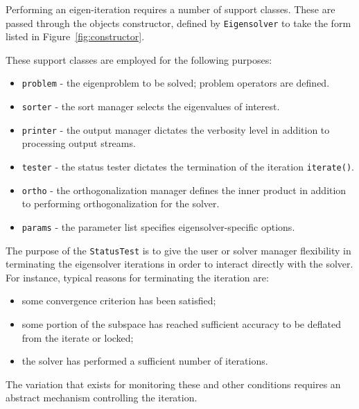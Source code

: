 \documentclass[acmtoms]{acmtrans2m}
\newcommand{\aspace}[1]{\texttt{#1}}
\begin{document}
Performing an eigen-iteration requires a number of support classes.  These are passed
through the objects constructor, defined by \aspace{Eigensolver} to take the form listed
in Figure~\ref{fig:constructor}.

These support classes are employed for the following purposes:
\begin{itemize}
  \item \verb!problem! - the eigenproblem to be solved; problem operators are
  defined.
  \item \verb!sorter! - the sort manager selects the
  eigenvalues of interest.
  \item \verb!printer! - the output manager dictates the verbosity level in addition to
    processing output streams.
  \item \verb!tester! - the status tester dictates the termination of the iteration
  \verb!iterate()!.
  \item \verb!ortho! - the orthogonalization manager defines the inner product
   in addition to performing orthogonalization for the solver.
  \item \verb!params! - the parameter list specifies eigensolver-specific
  options.
\end{itemize}

The purpose of the \aspace{StatusTest} is to give the user or solver
manager flexibility in terminating the eigensolver iterations in
order to interact directly with the solver. For instance, typical
reasons for terminating the iteration are:
\begin{itemize}
  \item some convergence criterion has been satisfied;
  \item some portion of the subspace has reached sufficient accuracy to be
  deflated from the iterate or locked;
  \item the solver has performed a sufficient number of iterations.
\end{itemize}
The variation that exists for monitoring these and other conditions requires an abstract mechanism
controlling the iteration.
\end{document}
